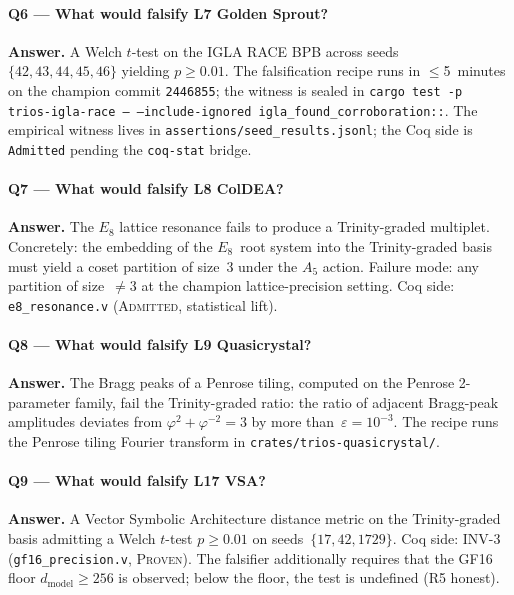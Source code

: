 \paragraph{Q6 — What would falsify L7 Golden Sprout?}

\textbf{Answer.} A Welch $t$-test on the IGLA RACE BPB across seeds
\(\{42, 43, 44, 45, 46\}\) yielding \(p \ge 0.01\). The falsification
recipe runs in \(\le\)5~minutes on the champion commit \texttt{2446855};
the witness is sealed in
\texttt{cargo test -p trios-igla-race -- --include-ignored igla\_found\_corroboration::}.
The empirical witness lives in \texttt{assertions/seed\_results.jsonl};
the Coq side is \texttt{Admitted} pending the \texttt{coq-stat} bridge.

\paragraph{Q7 — What would falsify L8 ColDEA?}

\textbf{Answer.} The \(E_8\) lattice resonance fails to produce a
Trinity-graded multiplet. Concretely: the embedding of the \(E_8\)~root
system into the Trinity-graded basis must yield a coset partition of
size~3 under the \(A_5\) action. Failure mode: any partition of
size~\(\ne 3\) at the champion lattice-precision setting. Coq side:
\texttt{e8\_resonance.v} (\textsc{Admitted}, statistical lift).

\paragraph{Q8 — What would falsify L9 Quasicrystal?}

\textbf{Answer.} The Bragg peaks of a Penrose tiling, computed on the
Penrose 2-parameter family, fail the Trinity-graded ratio: the ratio of
adjacent Bragg-peak amplitudes deviates from
\(\varphi^{2}+\varphi^{-2}=3\) by more than~\(\varepsilon = 10^{-3}\).
The recipe runs the Penrose tiling Fourier transform in
\texttt{crates/trios-quasicrystal/}.

\paragraph{Q9 — What would falsify L17 VSA?}

\textbf{Answer.} A Vector Symbolic Architecture distance metric on the
Trinity-graded basis admitting a Welch $t$-test \(p \ge 0.01\) on
seeds~\(\{17, 42, 1729\}\). Coq side: INV-3 (\texttt{gf16\_precision.v},
\textsc{Proven}). The falsifier additionally requires that the GF16
floor \(d_{\mathrm{model}} \ge 256\) is observed; below the floor, the
test is undefined (R5 honest).

